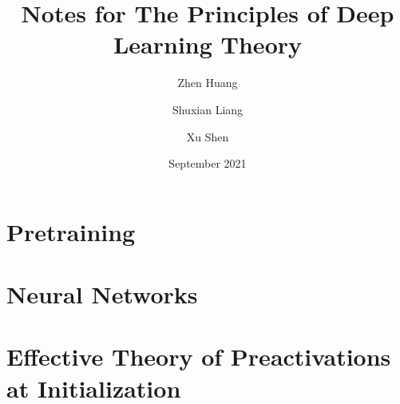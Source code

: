 \documentclass[12pt, letterpaper, twoside]{article}
\title{\textbf{Notes for The Principles of Deep Learning Theory}}
\author{Zhen Huang \and Shuxian Liang \and Xu Shen}
\date{September 2021}
\begin{document}
\begin{titlepage}
\maketitle
\end{titlepage}

\tableofcontents
\newpage

\section{Pretraining}


\section{Neural Networks}


\section{Effective Theory of Preactivations at Initialization}

\end{document}
